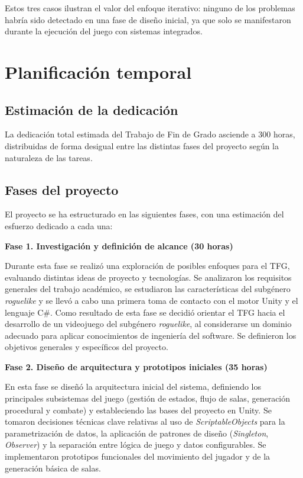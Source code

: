 Estos tres casos ilustran el valor del enfoque iterativo: ninguno de los problemas habría sido detectado en una fase de diseño inicial, ya que solo se manifestaron durante la ejecución del juego con sistemas integrados.

\section{Planificación temporal}


\subsection{Estimación de la dedicación}


La dedicación total estimada del Trabajo de Fin de Grado asciende a 300 horas, distribuidas de forma desigual entre las distintas fases del proyecto según la naturaleza de las tareas.

\subsection{Fases del proyecto}


El proyecto se ha estructurado en las siguientes fases, con una estimación del esfuerzo dedicado a cada una:

\textbf{Fase 1. Investigación y definición de alcance (30 horas)}

Durante esta fase se realizó una exploración de posibles enfoques para el TFG, evaluando distintas ideas de proyecto y tecnologías. Se analizaron los requisitos generales del trabajo académico, se estudiaron las características del subgénero \textit{roguelike} y se llevó a cabo una primera toma de contacto con el motor Unity y el lenguaje C\#. Como resultado de esta fase se decidió orientar el TFG hacia el desarrollo de un videojuego del subgénero \textit{roguelike}, al considerarse un dominio adecuado para aplicar conocimientos de ingeniería del software. Se definieron los objetivos generales y específicos del proyecto.

\textbf{Fase 2. Diseño de arquitectura y prototipos iniciales (35 horas)}

En esta fase se diseñó la arquitectura inicial del sistema, definiendo los principales subsistemas del juego (gestión de estados, flujo de salas, generación procedural y combate) y estableciendo las bases del proyecto en Unity. Se tomaron decisiones técnicas clave relativas al uso de \textit{ScriptableObjects} para la parametrización de datos, la aplicación de patrones de diseño (\textit{Singleton}, \textit{Observer}) y la separación entre lógica de juego y datos configurables. Se implementaron prototipos funcionales del movimiento del jugador y de la generación básica de salas.

